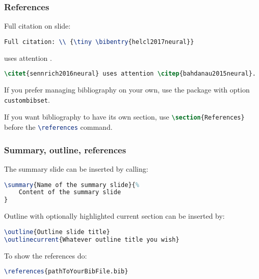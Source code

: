 \documentclass[handout,aspectratio=169]{beamer}
\begin{document}
\begin{frame}[fragile]
    \frametitle{References}

    Full citation on slide: \\ {\tiny {}}

\begin{lstlisting}[language=TeX]
Full citation: \\ {\tiny \bibentry{helcl2017neural}}
\end{lstlisting}

    \citet{sennrich2016neural} uses attention \citep{bahdanau2015neural}.

    \begin{lstlisting}[language=TeX]
\citet{sennrich2016neural} uses attention \citep{bahdanau2015neural}.
    \end{lstlisting}

    \tiny
    \citet{snover2006study,lu2016knowing,tu2016modeling,feng2016improving,zhang2016recurrent,alkhouli2016alignment,graves2014neural,specia2016shared,elliott2016multi30k}

If you prefer managing bibliography on your own, use the package with option
    \lstinline[language=TeX]{custombibset}.

If you want bibliography to have its own section, use 
    \lstinline[language=TeX]!\section{References}! before the 
	\lstinline[language=TeX]{\references} command. 

\end{frame}


\begin{frame}[fragile]
    \frametitle{Summary, outline, references}

    The summary slide can be inserted by calling:

    \begin{lstlisting}[language=TeX]
\summary{Name of the summary slide}{%
    Content of the summary slide
}
    \end{lstlisting}

    Outline with optionally highlighted current section can be inserted by:
    \begin{lstlisting}[language=TeX]
\outline{Outline slide title}
\outlinecurrent{Whatever outline title you wish}
    \end{lstlisting}

    To show the references do:

    \begin{lstlisting}[language=TeX]
\references{pathToYourBibFile.bib}
    \end{lstlisting}

\end{frame}
\end{document}
